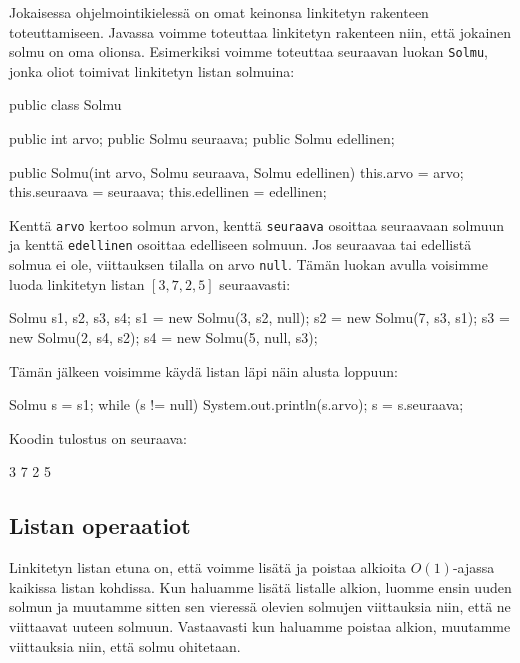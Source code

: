 Jokaisessa ohjelmointikielessä on omat keinonsa
linkitetyn rakenteen toteuttamiseen.
Javassa voimme toteuttaa linkitetyn rakenteen niin,
että jokainen solmu on oma olionsa.
Esimerkiksi voimme toteuttaa seuraavan luokan \texttt{Solmu},
jonka oliot toimivat linkitetyn listan solmuina:

\begin{code}
public class Solmu {
    public int arvo;
    public Solmu seuraava;
    public Solmu edellinen;

    public Solmu(int arvo, Solmu seuraava, Solmu edellinen) {
        this.arvo = arvo;
        this.seuraava = seuraava;
        this.edellinen = edellinen;
    }
}
\end{code}

Kenttä \texttt{arvo} kertoo solmun arvon,
kenttä \texttt{seuraava} osoittaa seuraavaan solmuun
ja kenttä \texttt{edellinen} osoittaa edelliseen solmuun.
Jos seuraavaa tai edellistä solmua ei ole,
viittauksen tilalla on arvo \texttt{null}.
Tämän luokan avulla voisimme luoda linkitetyn listan $[3,7,2,5]$
seuraavasti:

\begin{code}
Solmu s1, s2, s3, s4;
s1 = new Solmu(3, s2, null);
s2 = new Solmu(7, s3, s1);
s3 = new Solmu(2, s4, s2);
s4 = new Solmu(5, null, s3);
\end{code}

Tämän jälkeen voisimme käydä listan läpi näin alusta loppuun:

\begin{code}
Solmu s = s1;
while (s != null) {
    System.out.println(s.arvo);
    s = s.seuraava;
}
\end{code}

Koodin tulostus on seuraava:

\begin{code}
3
7
2
5
\end{code}

\subsection{Listan operaatiot}

Linkitetyn listan etuna on,
että voimme lisätä ja poistaa
alkioita $O(1)$-ajassa kaikissa listan kohdissa.
Kun haluamme lisätä listalle alkion,
luomme ensin uuden solmun ja muutamme sitten
sen vieressä olevien solmujen viittauksia niin,
että ne viittaavat uuteen solmuun.
Vastaavasti kun haluamme poistaa alkion,
muutamme viittauksia niin, että solmu ohitetaan.

